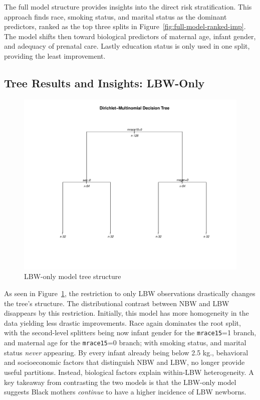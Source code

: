 The full model structure provides insights into the direct risk stratification. This approach finds race, smoking status, and marital status as the dominant predictors, ranked as the top three splits in Figure~\ref{fig:full-model-ranked-imp}. The model shifts then toward biological predictors of maternal age, infant gender, and adequacy of prenatal care. Lastly education status is only used in one split, providing the least improvement. 

\subsection{Tree Results and Insights: LBW-Only}
\label{sec:ch3-comparison}

\begin{figure}[H]
  \centering
  \includegraphics[width=1\textwidth]{chapters/chapter3/figures/dm_tree2021_2.pdf}
  \caption{LBW-only model tree structure}
  \label{fig:tree_2}
\end{figure}

As seen in Figure~\ref{fig:tree_2}, the restriction to only LBW observations drastically changes the tree's structure. The distributional contrast between NBW and LBW disappears by this restriction. Initially, this model has more homogeneity in the data yielding less drastic improvements. Race again dominates the root split, with the second-level splitters being now infant gender for the \texttt{mrace15}=1 branch, and maternal age for the \texttt{mrace15}=0 branch; with smoking status, and marital status \emph{never} appearing. By every infant already being below 2.5 kg., behavioral and socioeconomic factors that distinguish NBW and LBW, no longer provide useful partitions. Instead, biological factors explain within-LBW heterogeneity. A key takeaway from contrasting the two models is that the LBW-only model suggests Black mothers \textit{continue} to have a higher incidence of LBW newborns. 

